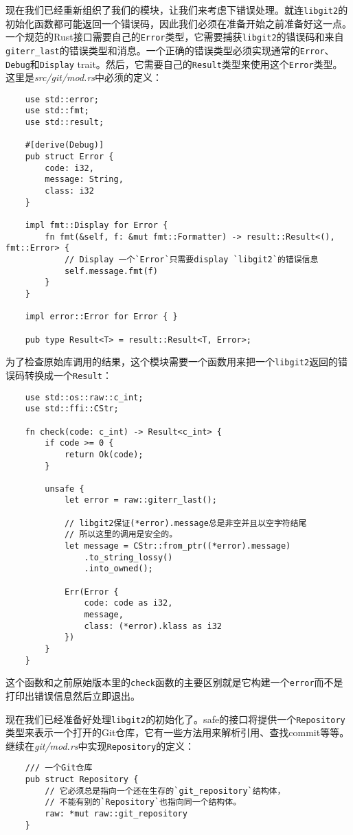 现在我们已经重新组织了我们的模块，让我们来考虑下错误处理。就连\texttt{libgit2}的初始化函数都可能返回一个错误码，因此我们必须在准备开始之前准备好这一点。一个规范的Rust接口需要自己的\texttt{Error}类型，它需要捕获\texttt{libgit2}的错误码和来自\texttt{giterr\_last}的错误类型和消息。一个正确的错误类型必须实现通常的\texttt{Error}、\texttt{Debug}和\texttt{Display} trait。然后，它需要自己的\texttt{Result}类型来使用这个\texttt{Error}类型。这里是\emph{src/git/mod.rs}中必须的定义：
\begin{verbatim}
    use std::error;
    use std::fmt;
    use std::result;

    #[derive(Debug)]
    pub struct Error {
        code: i32,
        message: String,
        class: i32
    }

    impl fmt::Display for Error {
        fn fmt(&self, f: &mut fmt::Formatter) -> result::Result<(), fmt::Error> {
            // Display 一个`Error`只需要display `libgit2`的错误信息
            self.message.fmt(f)
        }
    }

    impl error::Error for Error { }
    
    pub type Result<T> = result::Result<T, Error>;
\end{verbatim}

为了检查原始库调用的结果，这个模块需要一个函数用来把一个\texttt{libgit2}返回的错误码转换成一个\texttt{Result}：
\begin{verbatim}
    use std::os::raw::c_int;
    use std::ffi::CStr;

    fn check(code: c_int) -> Result<c_int> {
        if code >= 0 {
            return Ok(code);
        }

        unsafe {
            let error = raw::giterr_last();

            // libgit2保证(*error).message总是非空并且以空字符结尾
            // 所以这里的调用是安全的。
            let message = CStr::from_ptr((*error).message)
                .to_string_lossy()
                .into_owned();
            
            Err(Error {
                code: code as i32,
                message,
                class: (*error).klass as i32
            })
        }
    }
\end{verbatim}

这个函数和之前原始版本里的\texttt{check}函数的主要区别就是它构建一个\texttt{error}而不是打印出错误信息然后立即退出。

现在我们已经准备好处理\texttt{libgit2}的初始化了。safe的接口将提供一个\texttt{Repository}类型来表示一个打开的Git仓库，它有一些方法用来解析引用、查找commit等等。继续在\emph{git/mod.rs}中实现\texttt{Repository}的定义：
\begin{verbatim}
    /// 一个Git仓库
    pub struct Repository {
        // 它必须总是指向一个还在生存的`git_repository`结构体，
        // 不能有别的`Repository`也指向同一个结构体。
        raw: *mut raw::git_repository
    }
\end{verbatim}

